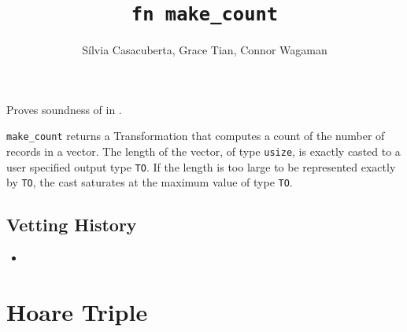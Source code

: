 \documentclass{article}
\title{\texttt{fn make\_count}}
\author{S\'ilvia Casacuberta, Grace Tian, Connor Wagaman}
\date{}
\begin{document}
\maketitle

\contrib
Proves soundness of  in .

\texttt{make\_count} returns a Transformation that computes a count of the number of records in a vector.
The length of the vector, of type \texttt{usize}, is exactly casted to a user specified output type \texttt{TO}.
If the length is too large to be represented exactly by \texttt{TO},
the cast saturates at the maximum value of type \texttt{TO}.

\subsection*{Vetting History}
\begin{itemize}
    \item {}
\end{itemize}

\section{Hoare Triple}
\end{document}

